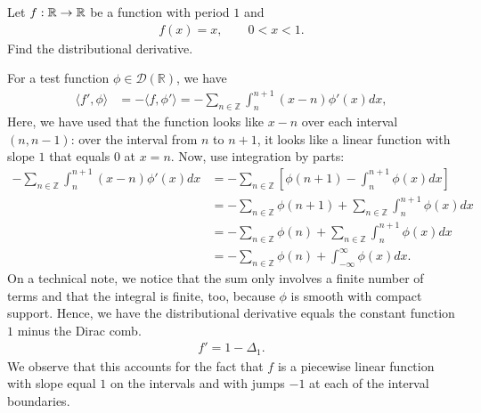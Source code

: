\documentclass[11pt]{article}
\begin{document}
\begin{exercise}
    Let $f : \mathbb{R} \rightarrow \mathbb{R}$ be a function with period $1$ and 
    \begin{align*}
        f(x) = x, \qquad 0 < x < 1.
    \end{align*}
    Find the distributional derivative. 
\end{exercise}
\begin{solution}
    For a test function $\phi \in \mathcal{D}(\mathbb{R})$, we have
    \begin{align*}
        \langle f', \phi \rangle 
        &= 
        - \langle f, \phi' \rangle 
        = 
        -\sum_{n \in \mathbb{Z}} \int_n^{n+1} (x - n) \phi'(x) dx 
        ,
    \end{align*}
    Here, we have used that the function looks like $x-n$ over each interval $(n,n-1)$:
    over the interval from $n$ to $n+1$, it looks like a linear function with slope $1$ that equals $0$ at $x=n$.
    Now, use integration by parts:
    \begin{align*}
        -\sum_{n \in \mathbb{Z}} \int_n^{n+1} (x - n) \phi'(x) dx 
        &
        = 
        -\sum_{n \in \mathbb{Z}} \left[ \phi(n + 1) - \int_{n}^{n+1} \phi(x) dx \right]
        \\&
        =
        -
        \sum_{n \in \mathbb{Z}} \phi(n + 1)
        +
        \sum_{n \in \mathbb{Z}} \int_{n}^{n+1} \phi(x) dx
        \\&
        =
        -
        \sum_{n \in \mathbb{Z}} \phi(n)
        +
        \sum_{n \in \mathbb{Z}} \int_{n}^{n+1} \phi(x) dx
        \\&
        =
        -
        \sum_{n \in \mathbb{Z}} \phi(n)
        +
        \int_{-\infty}^{\infty} \phi(x) dx
        .
    \end{align*}
    On a technical note, we notice that the sum only involves a finite number of terms and that the integral is finite, too, because $\phi$ is smooth with compact support. 
    Hence, we have the distributional derivative equals the constant function $1$ minus the Dirac comb.
    \begin{align*}
        f' = 1 - \Delta_1.
    \end{align*}
    We observe that this accounts for the fact that $f$ is a piecewise linear function with slope equal $1$ on the intervals and with jumps $-1$ at each of the interval boundaries.
\end{solution}
\end{document}
